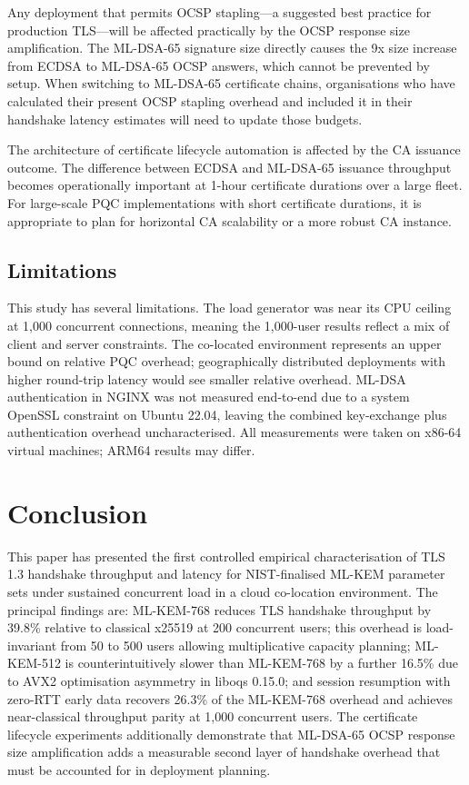 \documentclass[conference]{IEEEtran}
\begin{document}
Any deployment that permits OCSP stapling—a suggested best practice for production TLS—will be affected practically by the OCSP response size amplification. The ML-DSA-65 signature size directly causes the 9x size increase from ECDSA to ML-DSA-65 OCSP answers, which cannot be prevented by setup. When switching to ML-DSA-65 certificate chains, organisations who have calculated their present OCSP stapling overhead and included it in their handshake latency estimates will need to update those budgets.

The architecture of certificate lifecycle automation is affected by the CA issuance outcome. The difference between ECDSA and ML-DSA-65 issuance throughput becomes operationally important at 1-hour certificate durations over a large fleet. For large-scale PQC implementations with short certificate durations, it is appropriate to plan for horizontal CA scalability or a more robust CA instance.

\subsection{Limitations}

This study has several limitations. The load generator was near its CPU ceiling at 1,000
concurrent connections, meaning the 1,000-user results reflect a mix of client and server
constraints. The co-located environment represents an upper bound on relative PQC
overhead; geographically distributed deployments with higher round-trip latency would see
smaller relative overhead. ML-DSA authentication in NGINX was not measured end-to-end
due to a system OpenSSL constraint on Ubuntu 22.04, leaving the combined key-exchange
plus authentication overhead uncharacterised. All measurements were taken on x86-64
virtual machines; ARM64 results may differ.

\section{Conclusion}
\label{sec:conclusion}

This paper has presented the first controlled empirical characterisation of TLS 1.3
handshake throughput and latency for NIST-finalised ML-KEM parameter sets under
sustained concurrent load in a cloud co-location environment. The principal findings are:
ML-KEM-768 reduces TLS handshake throughput by 39.8\% relative to classical x25519 at
200 concurrent users; this overhead is load-invariant from 50 to 500 users allowing
multiplicative capacity planning; ML-KEM-512 is counterintuitively slower than ML-KEM-768
by a further 16.5\% due to AVX2 optimisation asymmetry in liboqs 0.15.0; and session
resumption with zero-RTT early data recovers 26.3\% of the ML-KEM-768 overhead and
achieves near-classical throughput parity at 1,000 concurrent users. The certificate
lifecycle experiments additionally demonstrate that ML-DSA-65 OCSP response size
amplification adds a measurable second layer of handshake overhead that must be accounted
for in deployment planning.
\end{document}
